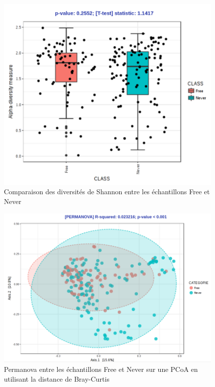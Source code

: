\documentclass[12pt,a4paper]{article}
\begin{document}
\begin{figure}[!h]
\begin{center}
\includegraphics[scale=0.70]{img/compare.png}\hfill
\end{center}
\caption{Comparaison des diversités de Shannon entre les échantillons Free et Never}
\label{compare}
\end{figure}


\begin{figure}[!h]
\begin{center}
\includegraphics[scale=0.50]{img/pcoa.png}\hfill
\end{center}
\caption{Permanova entre les échantillons Free et Never sur une PCoA en utilisant la distance de Bray-Curtis}
\label{pcoa}
\end{figure}
\end{document}
